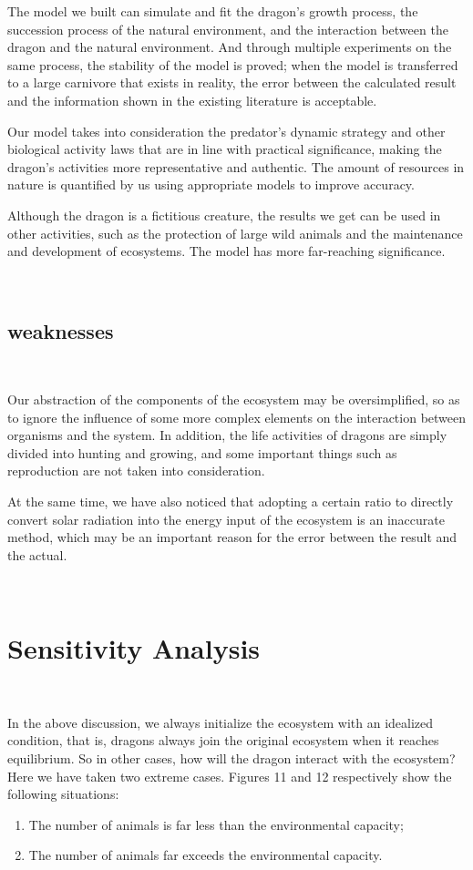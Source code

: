 \documentclass{mcmthesis}
\begin{document}
The model we built can simulate and fit the dragon's growth process, the succession process of the natural environment, and the interaction between the dragon and the natural environment. And through multiple experiments on the same process, the stability of the model is proved; when the model is transferred to a large carnivore that exists in reality, the error between the calculated result and the information shown in the existing literature is acceptable.

Our model takes into consideration the predator’s dynamic strategy and other biological activity laws that are in line with practical significance, making the dragon’s activities more representative and authentic. The amount of resources in nature is quantified by us using appropriate models to improve accuracy.

Although the dragon is a fictitious creature, the results we get can be used in other activities, such as the protection of large wild animals and the maintenance and development of ecosystems. The model has more far-reaching significance.

~\ \
\subsection{weaknesses}
~\ \

Our abstraction of the components of the ecosystem may be oversimplified, so as to ignore the influence of some more complex elements on the interaction between organisms and the system. In addition, the life activities of dragons are simply divided into hunting and growing, and some important things such as reproduction are not taken into consideration.

At the same time, we have also noticed that adopting a certain ratio to directly convert solar radiation into the energy input of the ecosystem is an inaccurate method, which may be an important reason for the error between the result and the actual.

~\ \
\section{Sensitivity Analysis}
~\ \

In the above discussion, we always initialize the ecosystem with an idealized condition, that is, dragons always join the original ecosystem when it reaches equilibrium. So in other cases, how will the dragon interact with the ecosystem? Here we have taken two extreme cases. Figures 11 and 12 respectively show the following situations: 
\begin{enumerate}
\item The number of animals is far less than the environmental capacity; 
\item The number of animals far exceeds the environmental capacity.
\end{enumerate}
\end{document}
